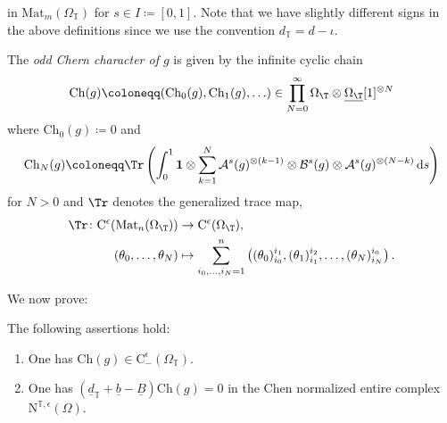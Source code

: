 \documentclass[a4paper, english, 12pt, bibliography=totocnumbered,
index=totoc]{scrartcl}
\begin{document}
in $\mathrm{Mat}_m(\Omega_{\mathbb{T}})$ for $s \in I \coloneqq
[0,1]$.
Note that we have slightly different signs in the above definitions since we
use the convention $d_{\mathbb{T}} = d - \iota$.
\begin{defn}
	The \textit{odd Chern character of $g$} is given by the infinite cyclic
	chain
	\begin{equation*}
		\mathrm{Ch}(g) \coloneqq (\mathrm{Ch}_0(g), \mathrm{Ch}_1(g), \ldots)
		\in \prod_{N = 0}^{\infty} \Omega_\T \otimes
		\underline{\Omega_\T}[1]^{\otimes N}
	\end{equation*}
	where $\mathrm{Ch}_0(g) \coloneqq 0$ and
	\begin{equation*}
		\mathrm{Ch}_N(g) \coloneqq \Tr \left(\int_0^1 \mathbf{1} \otimes
		\sum_{k=1}^{N} \mathcal{A}^s(g)^{\otimes(k-1)} \otimes
		\mathcal{B}^s(g)
		\otimes \mathcal{A}^s(g)^{\otimes(N-k)} \, \mathrm{d}s\right)
	\end{equation*}
	for $N > 0$ and $\Tr$ denotes the generalized trace map,
	\begin{align*}\label{Definition generalized trace}
		\begin{split}
			\Tr \colon \mathrm{C}^\epsilon(\mathrm{Mat}_n(\Omega_\T)) &\to
			\mathrm{C}^\epsilon(\Omega_\T), \\
			(\theta_0, \ldots, \theta_N) &\mapsto \sum_{i_0, \ldots, i_N =
				1}^n
			\left((\theta_0)_{i_0}^{i_1}, (\theta_1)_{i_1}^{i_2}, \ldots,
			(\theta_N)_{i_N}^{i_0}\right).
		\end{split}
	\end{align*}
\end{defn}
We now prove:
\begin{thm}
	The following assertions hold:
	\begin{enumerate}
		\item One has $\mathrm{Ch}(g) \in
		\mathrm{C}^{\epsilon}_{-}(\Omega_{\mathbb{T}})$.
		\item One has $(\underline{d}_{\mathbb{T}} + \underline{b} -
		\underline{B})\mathrm{Ch}(g) =
		0$ in the Chen normalized entire complex $\mathrm{N}^{\mathbb{T},
			\epsilon}(\Omega)$.
	\end{enumerate}
\end{thm}
\end{document}

